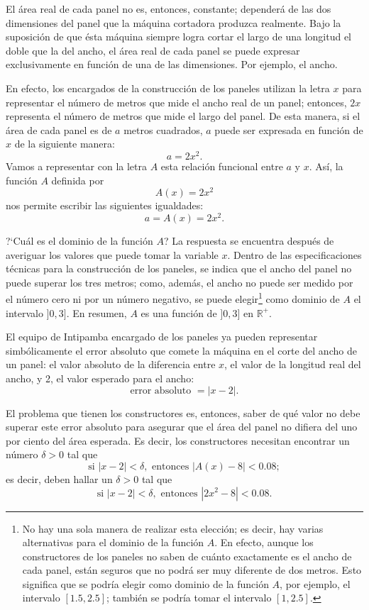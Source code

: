 El área real de cada panel no es, entonces, constante; dependerá de las dos dimensiones del panel
que la máquina cortadora produzca realmente. Bajo la suposición de que ésta máquina siempre logra
cortar el largo de una longitud el doble que la del ancho, el área real de cada panel se puede
expresar exclusivamente en función de una de las dimensiones. Por ejemplo, el ancho.

En efecto, los encargados de la construcción de los paneles utilizan la letra $x$ para representar
el número de metros que mide el ancho real de un panel; entonces, $2x$ representa el número de
metros que mide el largo del panel. De esta manera, si el área de cada panel es de $a$ metros
cuadrados, $a$ puede ser expresada en función de $x$ de la siguiente manera:
\[
a = 2x^2.
\]
Vamos a representar con la letra $A$ esta relación funcional entre $a$ y $x$. Así, la función $A$
definida por
\[
A(x) = 2x^2
\]
nos permite escribir las siguientes igualdades:
\[
a = A(x) = 2x^2.
\]

?`Cuál es el dominio de la función $A$? La respuesta se encuentra después de averiguar los valores
que puede tomar la variable $x$. Dentro de las especificaciones técnicas para la construcción de
los paneles, se indica que el ancho del panel no puede superar los tres metros; como, además, el
ancho no puede ser medido por el número cero ni por un número negativo, se puede elegir\footnote{No
hay una sola manera de realizar esta elección; es decir, hay varias alternativas para el dominio de
la función $A$. En efecto, aunque los constructores de los paneles no saben de cuánto exactamente
es el ancho de cada panel, están seguros que no podrá ser muy diferente de dos metros. Esto
significa que se podría elegir como dominio de la función $A$, por ejemplo, el intervalo $[1.5,
2.5]$; también se podría tomar el intervalo $[1,2.5]$.} como dominio de $A$ el intervalo $]0,3]$.
En resumen, $A$ es una función de $]0,3]$ en $\mathbb{R}^+$.

El equipo de Intipamba encargado de los paneles ya pueden representar simbólicamente el error
absoluto que comete la máquina en el corte del ancho de un panel: el valor absoluto de la
diferencia entre $x$, el valor de la longitud real del ancho, y 2, el valor esperado para el ancho:
\[
\text{error absoluto } = |x - 2|.
\]

El problema que tienen los constructores es, entonces, saber de qué valor no debe superar este
error absoluto para asegurar que el área del panel no difiera del uno por ciento del área esperada.
Es decir, los constructores necesitan encontrar un número $\delta > 0$ tal que
\[
\text{si } |x - 2| < \delta, \text{ entonces } |A(x) - 8| < 0.08;
\]
es decir, deben hallar un $\delta > 0$ tal que
\[
\text{si } |x - 2| < \delta, \text{ entonces } |2x^2 - 8| < 0.08.
\]

